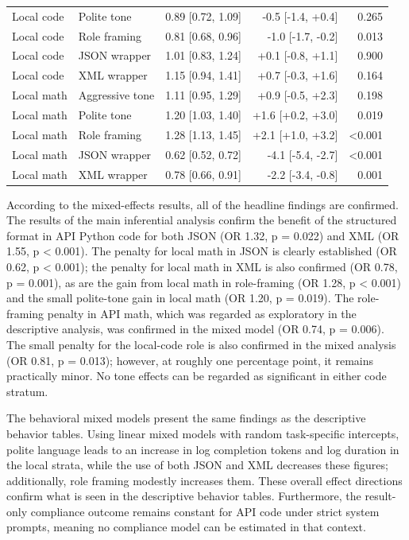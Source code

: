 {\begin{longtable}[]{@{}llrrr@{}}
Local code & Polite tone & 0.89 [0.72, 1.09] & -0.5 [-1.4, +0.4] & 0.265 \\
Local code & Role framing & 0.81 [0.68, 0.96] & -1.0 [-1.7, -0.2] & 0.013 \\
Local code & JSON wrapper & 1.01 [0.83, 1.24] & +0.1 [-0.8, +1.1] & 0.900 \\
Local code & XML wrapper & 1.15 [0.94, 1.41] & +0.7 [-0.3, +1.6] & 0.164 \\
Local math & Aggressive tone & 1.11 [0.95, 1.29] & +0.9 [-0.5, +2.3] & 0.198 \\
Local math & Polite tone & 1.20 [1.03, 1.40] & +1.6 [+0.2, +3.0] & 0.019 \\
Local math & Role framing & 1.28 [1.13, 1.45] & +2.1 [+1.0, +3.2] & \textless{}0.001 \\
Local math & JSON wrapper & 0.62 [0.52, 0.72] & -4.1 [-5.4, -2.7] & \textless{}0.001 \\
Local math & XML wrapper & 0.78 [0.66, 0.91] & -2.2 [-3.4, -0.8] & 0.001 \\
\end{longtable}
}

According to the mixed-effects results, all of the headline findings are confirmed. The results of the main inferential analysis confirm the benefit of the structured format in API Python code for both JSON (OR 1.32, p = 0.022) and XML (OR 1.55, p \textless{} 0.001). The penalty for local math in JSON is clearly established (OR 0.62, p \textless{} 0.001); the penalty for local math in XML is also confirmed (OR 0.78, p = 0.001), as are the gain from local math in role-framing (OR 1.28, p \textless{} 0.001) and the small polite-tone gain in local math (OR 1.20, p = 0.019). The role-framing penalty in API math, which was regarded as exploratory in the descriptive analysis, was confirmed in the mixed model (OR 0.74, p = 0.006). The small penalty for the local-code role is also confirmed in the mixed analysis (OR 0.81, p = 0.013); however, at roughly one percentage point, it remains practically minor. No tone effects can be regarded as significant in either code stratum.

The behavioral mixed models present the same findings as the descriptive behavior tables. Using linear mixed models with random task-specific intercepts, polite language leads to an increase in log completion tokens and log duration in the local strata, while the use of both JSON and XML decreases these figures; additionally, role framing modestly increases them. These overall effect directions confirm what is seen in the descriptive behavior tables. Furthermore, the result-only compliance outcome remains constant for API code under strict system prompts, meaning no compliance model can be estimated in that context.

